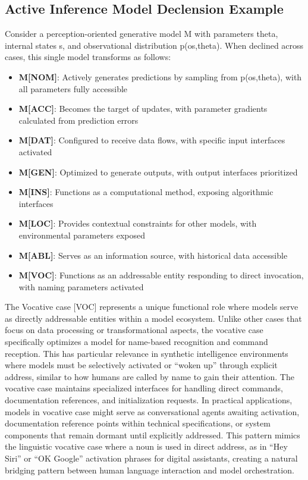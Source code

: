 \hypertarget{active-inference-model-declension-example}{%
\subsection{Active Inference Model Declension
Example}\label{active-inference-model-declension-example}}

Consider a perception-oriented generative model M with parameters theta,
internal states s, and observational distribution p(o\textbar s,theta).
When declined across cases, this single model transforms as follows:

\begin{itemize}
\tightlist
\item
  \textbf{M{[}NOM{]}}: Actively generates predictions by sampling from
  p(o\textbar s,theta), with all parameters fully accessible
\item
  \textbf{M{[}ACC{]}}: Becomes the target of updates, with parameter
  gradients calculated from prediction errors
\item
  \textbf{M{[}DAT{]}}: Configured to receive data flows, with specific
  input interfaces activated
\item
  \textbf{M{[}GEN{]}}: Optimized to generate outputs, with output
  interfaces prioritized
\item
  \textbf{M{[}INS{]}}: Functions as a computational method, exposing
  algorithmic interfaces
\item
  \textbf{M{[}LOC{]}}: Provides contextual constraints for other models,
  with environmental parameters exposed
\item
  \textbf{M{[}ABL{]}}: Serves as an information source, with historical
  data accessible
\item
  \textbf{M{[}VOC{]}}: Functions as an addressable entity responding to
  direct invocation, with naming parameters activated
\end{itemize}

The Vocative case {[}VOC{]} represents a unique functional role where
models serve as directly addressable entities within a model ecosystem.
Unlike other cases that focus on data processing or transformational
aspects, the vocative case specifically optimizes a model for name-based
recognition and command reception. This has particular relevance in
synthetic intelligence environments where models must be selectively
activated or ``woken up'' through explicit address, similar to how
humans are called by name to gain their attention. The vocative case
maintains specialized interfaces for handling direct commands,
documentation references, and initialization requests. In practical
applications, models in vocative case might serve as conversational
agents awaiting activation, documentation reference points within
technical specifications, or system components that remain dormant until
explicitly addressed. This pattern mimics the linguistic vocative case
where a noun is used in direct address, as in ``Hey Siri'' or ``OK
Google'' activation phrases for digital assistants, creating a natural
bridging pattern between human language interaction and model
orchestration.

